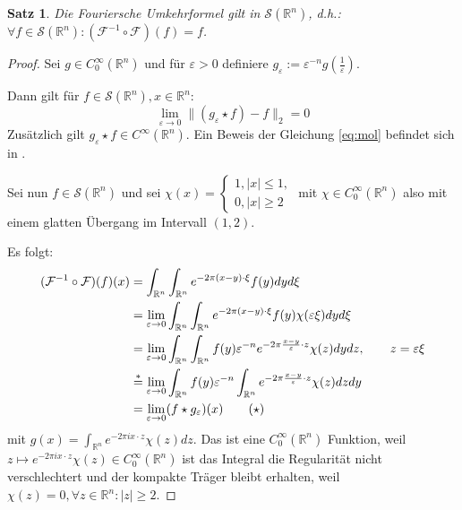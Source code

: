 \documentclass{article}
\newcommand{\R}[0]{\mathbb{R}}
\newcommand{\F}[0]{\mathcal{F}}
\newcommand{\Ssp}[0]{\mathcal{S}}
\theoremstyle{plain}
\newtheorem{thm}{Satz}[section]
\theoremstyle{definition}
\begin{document}
\begin{thm}
    Die Fouriersche Umkehrformel gilt in $\Ssp(\R^n)$, d.h.: $\forall f\in \Ssp(\R^n): (\F^{-1} \circ \F)(f) = f$.
\end{thm}

\begin{proof}\cite[S. 424, Theorem 24.1.1]{ebert2018methods}
    Sei $g \in C^{\infty}_0(\R^n)$ und für $\varepsilon > 0$ definiere $g_{\varepsilon} := \varepsilon^{-n} g(\frac{1}{\varepsilon})$.

    Dann gilt für $f \in \Ssp(\R^n), x \in \R^n$:
    \begin{equation}\label{eq:mol}
        \lim\limits_{\varepsilon \to 0} \lVert (g_{\varepsilon} \star f) - f\rVert_2 = 0
    \end{equation}
    Zusätzlich gilt $g_{\varepsilon} \star f \in C^{\infty}(\R^n)$.
    Ein Beweis der Gleichung \ref{eq:mol} befindet sich in \cite[S. 183ff.]{walter1966analysis}.

    Sei nun $f \in \Ssp(\R^n)$ und sei $\chi(x) = \begin{cases}
        1, |x| \leq 1, \\
        0, |x| \geq 2
    \end{cases}$ mit $\chi \in C^{\infty}_0(\R^n)$ also mit einem glatten Übergang im Intervall $(1, 2)$.

    Es folgt:
    \begin{align*}
        (\F^{-1} \circ \F)(f)(x) &= \int_{\R^n} \int_{\R^n} e^{-2\pi (x - y) \cdot \xi} f(y) dy d\xi \\
        &= \lim\limits_{\varepsilon \to 0} \int_{\R^n} \int_{\R^n} e^{-2\pi (x - y) \cdot \xi} f(y) \chi(\varepsilon \xi) dy d\xi \\
        &= \lim\limits_{\varepsilon \to 0} \int_{\R^n} \int_{\R^n} f(y) \varepsilon^{-n} e^{-2 \pi \frac{x - y}{\varepsilon} \cdot z}\chi(z) dy dz, \hspace*{20px} z = \varepsilon \xi \\
        &\overset{*}{=} \lim\limits_{\varepsilon \to 0} \int_{\R^n} f(y) \varepsilon^{-n} \int_{\R^n} e^{-2 \pi \frac{x - y}{\varepsilon} \cdot z}\chi(z) dz dy\\
        &= \lim\limits_{\varepsilon \to 0} (f \star g_{\varepsilon})(x) \hspace*{20px} (\star)
    \end{align*}
    mit $g(x) = \int_{\R^n}e^{-2\pi ix \cdot z} \chi(z) dz$. Das ist eine $C^{\infty}_0(\R^n)$ Funktion, weil $z \mapsto e^{-2\pi ix \cdot z} \chi(z) \in C^{\infty}_0(\R^n)$ 
    ist das Integral die Regularität nicht verschlechtert und der kompakte Träger bleibt erhalten, weil $\chi(z) = 0, \forall z \in \R^n: |z| \geq 2$.


\end{proof}
\end{document}
